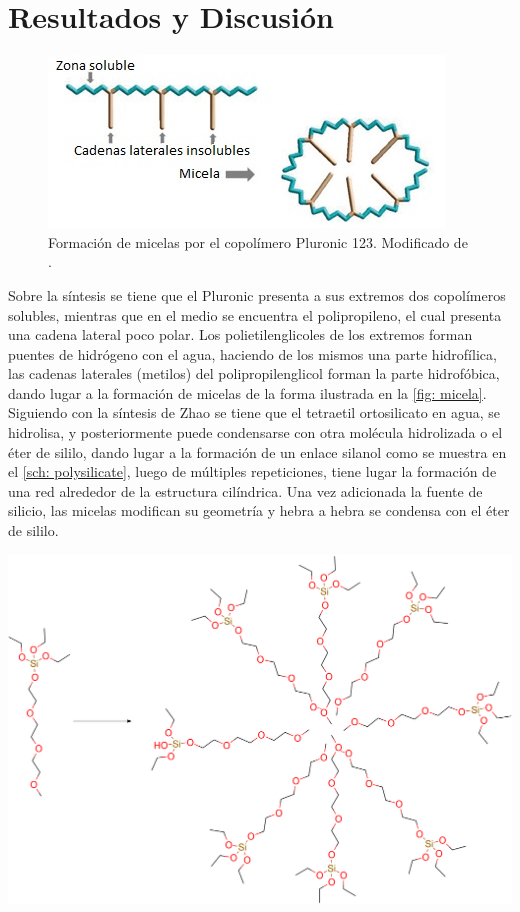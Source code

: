 \documentclass[fleqn,11pt]{SelfArx}
\begin{document}
	\section{Resultados y Discusi\'on}
	\begin{figure}[h]
		\centering
		\includegraphics[width=0.8\linewidth]{structures/Micela.jpg}
		\caption{Formaci\'on de micelas por el copol\'imero Pluronic 123. Modificado de \cite{grallert_rangel_yagui_pasqualoto_tavares_2012}.}
		\label{fig: micela}
	\end{figure}
	
	 Sobre la s\'intesis se tiene que el Pluronic presenta a sus extremos dos copol\'imeros solubles, mientras que en el medio se encuentra el polipropileno, el cual presenta una cadena lateral poco polar. Los polietilenglicoles de los extremos forman puentes de hidr\'ogeno con el agua, haciendo de los mismos una parte hidrof\'ilica, las cadenas laterales (metilos) del polipropilenglicol forman la parte hidrof\'obica, dando lugar a la formaci\'on de micelas de la forma ilustrada en la \autoref{fig: micela}. Siguiendo con la s\'intesis de Zhao se tiene que el tetraetil ortosilicato en agua, se hidrolisa, y posteriormente puede condensarse con otra mol\'ecula hidrolizada o el \'eter de sililo, dando lugar a la formaci\'on de un enlace silanol como se muestra en el \autoref{sch: polysilicate}, luego de m\'ultiples repeticiones, tiene lugar la formaci\'on de una red alrededor de la estructura cil\'indrica. Una vez adicionada la fuente de silicio, las micelas modifican su geometr\'ia y hebra a hebra se condensa con el \'eter de sililo.
	\begin{scheme}[h]
		\centering
		\includegraphics[width=0.95\linewidth]{structures/micelaSi.png}
		\caption{Formaci\'on de las micelas con la incorporaci\'on del silicio \cite{yang_2011}.}
		\label{sch: micelaSi1}
	\end{scheme}
	
\end{document}
